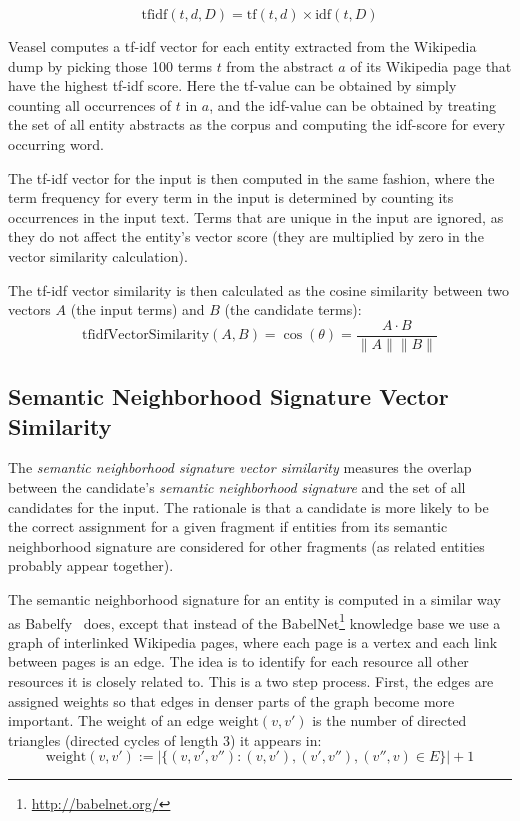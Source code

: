 \documentclass[runningheads,a4paper]{llncs}
\begin{document}
{$$ \mathrm{tfidf}(t, d, D) = \mathrm{tf}(t, d) \times \mathrm{idf}(t, D) $$

Veasel computes a tf-idf vector for each entity extracted from the Wikipedia dump by picking those 100 terms $t$ from the abstract $a$ of its Wikipedia page that have the highest tf-idf score. Here the tf-value can be obtained by simply counting all occurrences of $t$ in $a$, and the idf-value can be obtained by treating the set of all entity abstracts as the corpus and computing the idf-score for every occurring word. 

The tf-idf vector for the input is then computed in the same fashion, where the term frequency for every term in the input is determined by counting its occurrences in the input text. Terms that are unique in the input are ignored, as they do not affect the entity's vector score (they are multiplied by zero in the vector similarity calculation).

The tf-idf vector similarity is then calculated as the cosine similarity between two vectors $A$ (the input terms) and $B$ (the candidate terms):
$$\mathrm{tfidfVectorSimilarity}(A, B) = \cos(\theta) = \frac{A \cdot B}{\|A\| \|B\|}$$

\subsection{Semantic Neighborhood Signature Vector Similarity}

The \emph{semantic neighborhood signature vector similarity} measures the overlap between the candidate's \emph{semantic neighborhood signature} and the set of all candidates for the input. The rationale is that a candidate is more likely to be the correct assignment for a given fragment if entities from its semantic neighborhood signature are considered for other fragments (as related entities probably appear together).

The semantic neighborhood signature for an entity is computed in a similar way as Babelfy~\cite{babelfy} does, except that instead of the BabelNet\footnote{\url{http://babelnet.org/}} knowledge base we use a graph of interlinked Wikipedia pages, where each page is a vertex and each link between pages is an edge. The idea is to identify for each resource all other resources it is closely related to. This is a two step process. First, the edges are assigned weights so that edges in denser parts of the graph become more important. The weight of an edge $\mathrm{weight}(v, v')$ is the number of directed triangles (directed cycles of length 3) it appears in:
$$\mathrm{weight}(v, v') := |\{(v, v', v'') : (v, v'), (v', v''), (v'', v) \in E\}| + 1$$

}
\end{document}
